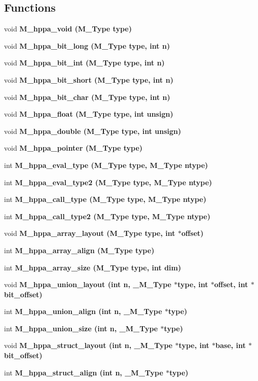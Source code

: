 \subsection*{Functions}
\begin{CompactItemize}
\item 
void \bf{M\_\-hppa\_\-void} (\bf{M\_\-Type} type)
\item 
void \bf{M\_\-hppa\_\-bit\_\-long} (\bf{M\_\-Type} type, int n)
\item 
void \bf{M\_\-hppa\_\-bit\_\-int} (\bf{M\_\-Type} type, int n)
\item 
void \bf{M\_\-hppa\_\-bit\_\-short} (\bf{M\_\-Type} type, int n)
\item 
void \bf{M\_\-hppa\_\-bit\_\-char} (\bf{M\_\-Type} type, int n)
\item 
void \bf{M\_\-hppa\_\-float} (\bf{M\_\-Type} type, int unsign)
\item 
void \bf{M\_\-hppa\_\-double} (\bf{M\_\-Type} type, int unsign)
\item 
void \bf{M\_\-hppa\_\-pointer} (\bf{M\_\-Type} type)
\item 
int \bf{M\_\-hppa\_\-eval\_\-type} (\bf{M\_\-Type} type, \bf{M\_\-Type} ntype)
\item 
int \bf{M\_\-hppa\_\-eval\_\-type2} (\bf{M\_\-Type} type, \bf{M\_\-Type} ntype)
\item 
int \bf{M\_\-hppa\_\-call\_\-type} (\bf{M\_\-Type} type, \bf{M\_\-Type} ntype)
\item 
int \bf{M\_\-hppa\_\-call\_\-type2} (\bf{M\_\-Type} type, \bf{M\_\-Type} ntype)
\item 
void \bf{M\_\-hppa\_\-array\_\-layout} (\bf{M\_\-Type} type, int $\ast$offset)
\item 
int \bf{M\_\-hppa\_\-array\_\-align} (\bf{M\_\-Type} type)
\item 
int \bf{M\_\-hppa\_\-array\_\-size} (\bf{M\_\-Type} type, int dim)
\item 
void \bf{M\_\-hppa\_\-union\_\-layout} (int n, \bf{\_\-M\_\-Type} $\ast$type, int $\ast$offset, int $\ast$bit\_\-offset)
\item 
int \bf{M\_\-hppa\_\-union\_\-align} (int n, \bf{\_\-M\_\-Type} $\ast$type)
\item 
int \bf{M\_\-hppa\_\-union\_\-size} (int n, \bf{\_\-M\_\-Type} $\ast$type)
\item 
void \bf{M\_\-hppa\_\-struct\_\-layout} (int n, \bf{\_\-M\_\-Type} $\ast$type, int $\ast$base, int $\ast$bit\_\-offset)
\item 
int \bf{M\_\-hppa\_\-struct\_\-align} (int n, \bf{\_\-M\_\-Type} $\ast$type)

\end{CompactItemize}
